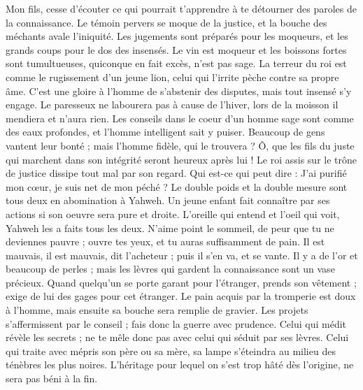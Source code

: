 \begin{multicols}{2}
Mon fils, cesse d'écouter ce qui pourrait t'apprendre à te détourner des paroles de la connaissance.
Le témoin pervers se moque de la justice, et la bouche des méchants avale l'iniquité.
Les jugements sont préparés pour les moqueurs, et les grands coups pour le dos des insensés.
\VerseOne{}Le vin est moqueur et les boissons fortes sont tumultueuses, quiconque en fait excès, n'est pas sage.
La terreur du roi est comme le rugissement d'un jeune lion, celui qui l'irrite pèche contre sa propre âme.
C'est une gloire à l'homme de s'abstenir des disputes, mais tout insensé s'y engage.
Le paresseux ne labourera pas à cause de l'hiver, lors de la moisson il mendiera et n'aura rien.
Les conseils dans le coeur d'un homme sage sont comme des eaux profondes, et l'homme intelligent sait y puiser.
Beaucoup de gens vantent leur bonté ; mais l'homme fidèle, qui le trouvera ?
Ô, que les fils du juste qui marchent dans son intégrité seront heureux après lui !
Le roi assis sur le trône de justice dissipe tout mal par son regard.
Qui est-ce qui peut dire : J'ai purifié mon cœur, je suis net de mon péché ?
Le double poids et la double mesure sont tous deux en abomination à Yahweh.
Un jeune enfant fait connaître par ses actions si son oeuvre sera pure et droite.
L'oreille qui entend et l'oeil qui voit, Yahweh les a faits tous les deux.
N'aime point le sommeil, de peur que tu ne deviennes pauvre ; ouvre tes yeux, et tu auras suffisamment de pain.
Il est mauvais, il est mauvais, dit l'acheteur ; puis il s'en va, et se vante.
Il y a de l'or et beaucoup de perles ; mais les lèvres qui gardent la connaissance sont un vase précieux.
Quand quelqu'un se porte garant pour l'étranger, prends son vêtement ; exige de lui des gages pour cet étranger.
Le pain acquis par la tromperie est doux à l'homme, mais ensuite sa bouche sera remplie de gravier.
Les projets s'affermissent par le conseil ; fais donc la guerre avec prudence.
Celui qui médit révèle les secrets ; ne te mêle donc pas avec celui qui séduit par ses lèvres.
Celui qui traite avec mépris son père ou sa mère, sa lampe s'éteindra au milieu des ténèbres les plus noires.
L'héritage pour lequel on s'est trop hâté dès l'origine, ne sera pas béni à la fin.

\end{multicols}

